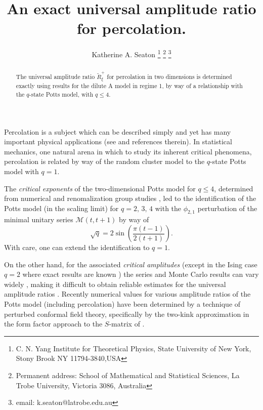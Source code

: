 \documentclass[a4paper,a4paper]{article}
\begin{document}
\title{An exact universal amplitude ratio for percolation.}
\author{Katherine A. Seaton
\thanks{
C. N. Yang Institute for
Theoretical Physics, State University of
New York, Stony Brook NY 11794-3840,USA}
\thanks{
Permanent address:
School of Mathematical and Statistical Sciences,
La Trobe University, Victoria 3086, Australia}
\thanks{email: k.seaton@latrobe.edu.au}}

\maketitle


\begin{abstract}The universal amplitude ratio $\tilde{R}_{\xi}^{+}$ for
percolation in two dimensions is determined exactly
using results for the dilute A
model in regime 1, by way of a relationship with the $q$-state Potts
model, with $q\leqslant 4$. 
\end{abstract}


Percolation is a subject which can be described simply and 
yet has many important physical applications (see \cite{SA}
and references therein). In statistical mechanics, one natural
arena in which to study its inherent critical phenomena,  
percolation is related by way of the random cluster model
\cite{FK} to  the $q$-state Potts model with $q=1$. 

The {\it critical exponents}
of the two-dimensional Potts model 
for $q\leqslant 4$, determined from numerical and
renomalization group studies \cite{dn, nien},
led to the identification \cite{dot}  of  the Potts model 
(in the scaling limit) 
for $q=2,\, 3,\, 4$ 
with the $\phi_{2,1}$
perturbation of the minimal unitary series $\mathcal{M}(t,t+1)$
by way of
\begin{equation}
\sqrt{q}=2 \sin\left(\frac{\pi(t-1)}{2(t+1)}\right). \label{qt}
\end{equation}
With care, one can extend the identification to $q=1$.


On the other hand, for the
associated {\it critical amplitudes} (except in the Ising case $q=2$
where exact results are known \cite{McWu}) the series and Monte Carlo
results can vary widely \cite{wu}, making it difficult to obtain
reliable estimates for the universal amplitude ratios \cite{PHA}.
Recently numerical values for 
various amplitude ratios of the Potts model (including percolation) have
been determined \cite{dc} by a technique of perturbed conformal field
theory, specifically by the two-kink approximation in the
form factor approach  to the $S$-matrix of \cite{chim}.
\end{document}
